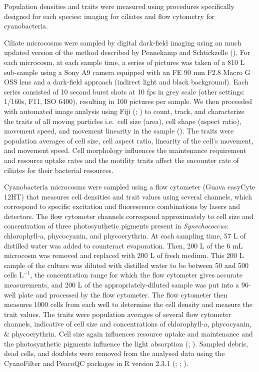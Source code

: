 \documentclass[
  letterpaper,
  DIV=11,
  numbers=noendperiod]{scrartcl}
\begin{document}
Population densities and traits were measured using procedures
specifically designed for each species: imaging for ciliates and flow
cytometry for cyanobacteria.

Ciliate microcosms were sampled by digital dark-field imaging using an
much updated version of the method described by Pennekamp and
Schtickzelle (). For each microcosm,
at each sample time, a series of pictures was taken of a 810 \textmu L
sub-sample using a Sony A9 camera equipped with an FE 90 mm F2.8 Macro G
OSS lens and a dark-field approach (indirect light and black
background). Each series consisted of 10 second burst shots at 10 fps in
grey scale (other settings: 1/160s, F11, ISO 6400), resulting in 100
pictures per sample. We then proceeded with automated image analysis
using Fiji (;
) to count, track, and
characterize the traits of all moving particles i.e.~cell size (area),
cell shape (aspect ratio), movement speed, and movement linearity in the
sample (). The traits
were population averages of cell size, cell aspect ratio, linearity of
the cell's movement, and movement speed. Cell morphology influences the
maintenance requirement and resource uptake rates and the motility
traits affect the encounter rate of ciliates for their bacterial
resources.

Cyanobacteria microcosms were sampled using a flow cytometer (Guava
easyCyte 12HT) that measures cell densities and trait values using
several channels, which correspond to specific excitation and
fluorescence combinations by lasers and detectors. The flow cytometer
channels correspond approximately to cell size and concentration of
three photosynthetic pigments present in \emph{Synechococcus}:
chlorophyll-a, phycocyanin, and phycoerythrin. At each sampling time, 57
\textmu  L of distilled water was added to counteract evaporation. Then,
200 \textmu L of the 6 mL microcosm was removed and replaced with 200
\textmu L of fresh medium. This 200 \textmu L sample of the culture was
diluted with distilled water to be between 50 and 500 cells
\textmu \(\mathrm{L}^{-1}\), the concentration range for which the flow
cytometer gives accurate measurements, and 200 \textmu L of the
appropriately-diluted sample was put into a 96-well plate and processed
by the flow cytometer. The flow cytometer then measures 1000 cells from
each well to determine the cell density and measure the trait values.
The traits were population averages of several flow cytometer channels,
indicative of cell size and concentrations of chlorophyll-a,
phycocyanin, \& phycoerythrin. Cell size again influences resource
uptake and maintenance and the photosynthetic pigments influence the
light absorption (;
). Sampled debris, dead
cells, and doublets were removed from the analysed data using the
CyanoFilter and PeacoQC packages in R version 2.3.1
(;
; ).
\end{document}

